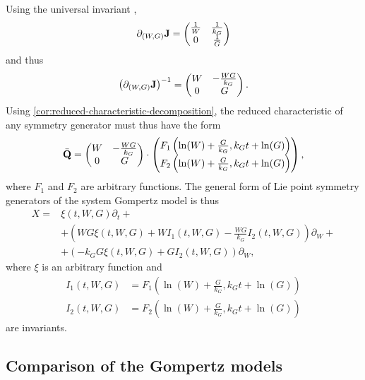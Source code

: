 Using the universal invariant ,
\begin{equation}
  \partial_{(W, G)} \vb{J} =
  \begin{pmatrix}
    \frac{1}{W} & \frac{1}{k_G} \\
    0 & \frac{1}{G}
  \end{pmatrix}
\end{equation}
and thus
\begin{equation}
  \left(\partial_{(W, G)} \vb{J}\right)^{-1} =
  \begin{pmatrix}
    W & - \frac{W G}{k_G} \\
    0 & G
  \end{pmatrix}.
\end{equation}
Using \cref{cor:reduced-characteristic-decomposition}, the reduced characteristic of any symmetry generator must thus have the form
\begin{equation} \label{eq:general-system-gompertz-characteristic}
  \bar{\vb{Q}} =
  \begin{pmatrix}
    W & - \frac{W G}{k_G} \\
    0 & G
  \end{pmatrix}
  \cdot
  \begin{pmatrix}
    F_1\left(\ln(W) + \frac{G}{k_G}, k_G t + \ln(G)\right) \\
    F_2\left(\ln(W) + \frac{G}{k_G}, k_G t + \ln(G)\right)
  \end{pmatrix},
\end{equation}
where \(F_1\) and \(F_2\) are arbitrary functions.
The general form of Lie point symmetry generators of the system Gompertz model is thus
\begin{align}
  X =& \xi(t, W, G) \partial_t + \\
  &+ \left(W G \xi(t, W, G) + W I_1(t, W, G) - \frac{W G}{k_G} I_2(t, W, G)\right) \partial_W + \\
  &+ \left(-k_G G \xi(t, W, G) + G I_2(t, W, G)\right) \partial_W,
\end{align}
where \(\xi\) is an arbitrary function and
\begin{align}
  I_1(t, W, G) &= F_1\left(\ln(W) + \frac{G}{k_G}, k_G t + \ln(G)\right) \\
  I_2(t, W, G) &= F_2\left(\ln(W) + \frac{G}{k_G}, k_G t + \ln(G)\right)
\end{align}
are invariants.

\subsection{Comparison of the Gompertz models}

